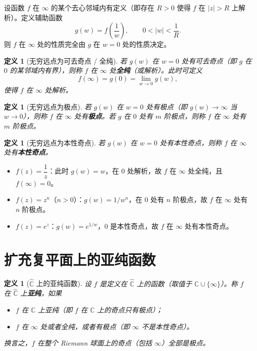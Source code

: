 \documentclass[UTF8]{ctexart}
\newtheorem{definition}[theorem]{定义}
\numberwithin{equation}{section}
\newcommand{\CC}{\mathbb{C}}
\begin{document}
设函数 $f$ 在 $\infty$ 的某个去心邻域内有定义（即存在 $R>0$ 使得 $f$ 在 $|z|>R$ 上解析）。定义辅助函数
\[
g(w) = f\!\left(\frac{1}{w}\right), \qquad 0 < |w| < \frac{1}{R}.
\]
则 $f$ 在 $\infty$ 处的性质完全由 $g$ 在 $w=0$ 处的性质决定。

\begin{definition}[无穷远点为可去奇点 / 全纯]
若 $g(w)$ 在 $w=0$ 处有可去奇点（即 $g$ 在 $0$ 的某邻域内有界），则称 $f$ 在 $\infty$ 处\textbf{全纯}（或解析）。此时可定义
\[
f(\infty) = g(0) = \lim_{w\to 0} g(w),
\]
使得 $f$ 在 $\infty$ 处解析。
\end{definition}

\begin{definition}[无穷远点为极点]
若 $g(w)$ 在 $w=0$ 处有极点（即 $g(w) \to \infty$ 当 $w\to 0$），则称 $f$ 在 $\infty$ 处有\textbf{极点}。若 $g$ 在 $0$ 处有 $m$ 阶极点，则称 $f$ 在 $\infty$ 处有 $m$ 阶极点。
\end{definition}

\begin{definition}[无穷远点为本性奇点]
若 $g(w)$ 在 $w=0$ 处有本性奇点，则称 $f$ 在 $\infty$ 处有\textbf{本性奇点}。
\end{definition}


\begin{itemize}
\item $f(z) = \dfrac{1}{z}$：此时 $g(w)=w$，在 $0$ 处解析，故 $f$ 在 $\infty$ 处全纯，且 $f(\infty)=0$。
\item $f(z)=z^n$（$n>0$）：$g(w)=1/w^n$，在 $0$ 处有 $n$ 阶极点，故 $f$ 在 $\infty$ 处有 $n$ 阶极点。
\item $f(z)=e^z$：$g(w)=e^{1/w}$，$0$ 是本性奇点，故 $f$ 在 $\infty$ 处有本性奇点。
\end{itemize}


\section{扩充复平面上的亚纯函数}

\begin{definition}[$\widehat{\CC}$ 上的亚纯函数]
设 $f$ 是定义在 $\widehat{\CC}$ 上的函数（取值于 $\CC \cup \{\infty\}$）。称 $f$ 在 $\widehat{\CC}$ 上\textbf{亚纯}，如果
\begin{itemize}
\item $f$ 在 $\CC$ 上亚纯（即 $f$ 在 $\CC$ 上的奇点只有极点）；
\item $f$ 在 $\infty$ 处或者全纯，或者有极点（即 $\infty$ 不是本性奇点）。
\end{itemize}
换言之，$f$ 在整个 Riemann 球面上的奇点（包括 $\infty$）全部是极点。
\end{definition}
\end{document}
